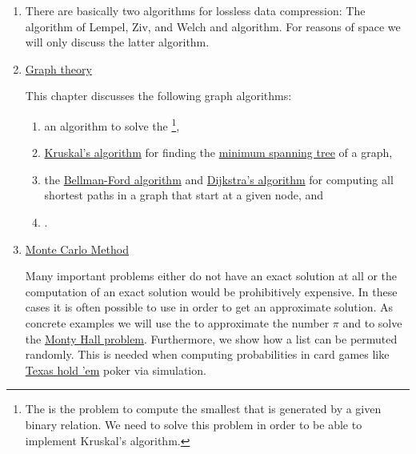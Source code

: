 \begin{enumerate}
      A  is a data structure that can best be described as a sorted list that remains
      sorted when elements are inserted or removed.
      Some  algorithms use  as one of their basic building blocks.
      Therefore, our discussion of  is preceded by a chapter on priority queues.
\item {}

      There are basically two algorithms for lossless data compression: The algorithm of Lempel, Ziv, and
      Welch and  algorithm.  For reasons of space we will only discuss the latter algorithm.
\item \href{http://en.wikipedia.org/wiki/Graph_theory}{Graph theory}
  
      This chapter discusses the following graph algorithms:
      \begin{enumerate}
      \item an algorithm to solve the \footnote{
              The  is the problem to compute the smallest 
              that is generated by a given binary relation. We need to solve this problem in order to be able
              to implement Kruskal's algorithm.
            },
      \item \href{https://en.wikipedia.org/wiki/Kruskal%27s_algorithm}{Kruskal's algorithm} for finding the
            \href{https://en.wikipedia.org/wiki/Minimum_spanning_tree}{minimum spanning tree} of a graph,
      \item the \href{https://en.wikipedia.org/wiki/Bellman-Ford_algorithm}{Bellman-Ford algorithm} and
            \href{http://en.wikipedia.org/wiki/Dijkstra%27s_algorithm}{Dijkstra's algorithm}
            for computing all shortest paths in a graph that start at a given node, and
      \item {}.
      \end{enumerate}
\item \href{http://en.wikipedia.org/wiki/Monte_Carlo_method}{Monte Carlo Method} 
 
      Many important problems either do not have an exact solution at all or the computation of an
      exact solution would be prohibitively expensive.  In these cases it is often possible to use 
       in order to get an approximate solution.  As concrete examples we will use the
       to approximate the number $\pi$ and to solve the
      \href{https://en.wikipedia.org/wiki/Monty_Hall_problem}{Monty Hall problem}.  Furthermore, we show how a
      list can be permuted randomly.  This is needed when computing probabilities in card games like
      \href{http://en.wikipedia.org/wiki/Texas_hold_%27em}{Texas hold 'em} poker via simulation.
\end{enumerate}

